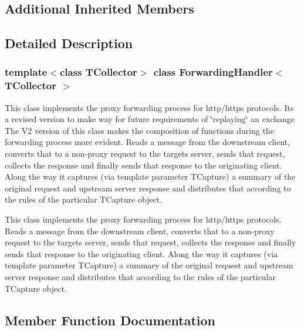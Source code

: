 \subsection*{Additional Inherited Members}


\subsection{Detailed Description}
\subsubsection*{template$<$class T\+Collector$>$\newline
class Forwarding\+Handler$<$ T\+Collector $>$}

This class implements the proxy forwarding process for http/https protocols. Its a revised version to make way for future requirements of \char`\"{}replaying\char`\"{} an exchange The V2 version of this class makes the composition of functions during the forwarding process more evident.  Reads a message from the downstream client, converts that to a non-\/proxy request to the targets server, sends that request, collects the response and finally sends that response to the originating client. Along the way it captures (via template parameter T\+Capture) a summary of the original request and upstream server response and distributes that according to the rules of the particular T\+Capture object. 

This class implements the proxy forwarding process for http/https protocols.  Reads a message from the downstream client, converts that to a non-\/proxy request to the targets server, sends that request, collects the response and finally sends that response to the originating client. Along the way it captures (via template parameter T\+Capture) a summary of the original request and upstream server response and distributes that according to the rules of the particular T\+Capture object. 

\subsection{Member Function Documentation}
\mbox{\label{class_forwarding_handler_ac4f8ecec2ca1267b8fdf806c5d4cc155}} 
